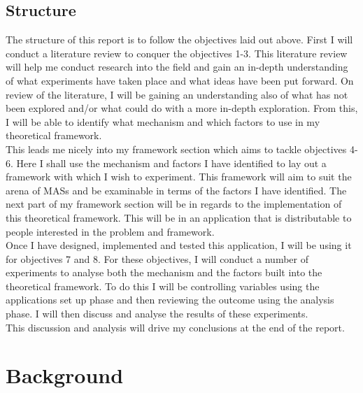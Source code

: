 \documentclass[]{final_report}
\begin{document}
\section{Structure}
The structure of this report is to follow the objectives laid out above. First I will conduct a literature review to conquer the objectives 1-3. This literature review will help me conduct research into the field and gain an in-depth understanding of what experiments have taken place and what ideas have been put forward. On review of the literature, I will be gaining an understanding also of what has not been explored and/or what could do with a more in-depth exploration. From this, I will be able to identify what mechanism and which factors to use in my theoretical framework.\\
This leads me nicely into my framework section which aims to tackle objectives 4-6. Here I shall use the mechanism and factors I have identified to lay out a framework with which I wish to experiment. This framework will aim to suit the arena of MASs and be examinable in terms of the factors I have identified. The next part of my framework section will be in regards to the implementation of this theoretical framework. This will be in an application that is distributable to people interested in the problem and framework.\\
Once I have designed, implemented and tested this application, I will be using it for objectives 7 and 8. For these objectives, I will conduct a number of experiments to analyse both the mechanism and the factors built into the theoretical framework. To do this I will be controlling variables using the applications set up phase and then reviewing the outcome using the analysis phase. I will then discuss and analyse the results of these experiments.\\
This discussion and analysis will drive my conclusions at the end of the report.


\chapter{Background}
\end{document}
